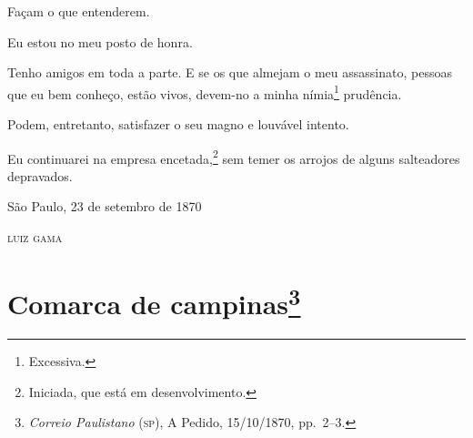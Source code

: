 {Façam o que entenderem.

Eu estou no meu posto de honra.

Tenho amigos em toda a parte. E se os que almejam o meu assassinato,
pessoas que eu bem conheço, estão vivos, devem-no a minha
nímia\footnote{ Excessiva.} prudência.

Podem, entretanto, satisfazer o seu magno e louvável intento.

Eu continuarei na empresa encetada,\footnote{ Iniciada, que está em
  desenvolvimento.} sem temer os arrojos de alguns salteadores
depravados.

\begin{flushright}
São Paulo, 23 de setembro de 1870

\textsc{luiz gama}
\end{flushright}

\chapter{Comarca de campinas\footnote{\emph{Correio Paulistano} (\textsc{sp}), A Pedido, 15/10/1870,
  pp.~2--3.}} %

}
